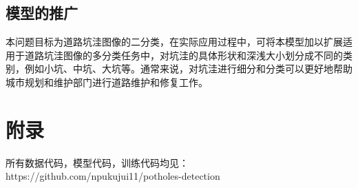 \documentclass[a4paper, 10pt]{article}
\begin{document}
	
	\subsection{模型的推广}
	
	本问题目标为道路坑洼图像的二分类，在实际应用过程中，可将本模型加以扩展适用于道路坑洼图像的多分类任务中，对坑洼的具体形状和深浅大小划分成不同的类别，例如小坑、中坑、大坑等。通常来说，对坑洼进行细分和分类可以更好地帮助城市规划和维护部门进行道路维护和修复工作。
	
	
	\section{附录}
	
	所有数据代码，模型代码，训练代码均见：https://github.com/npukujui11/potholes-detection
	
		
		
		
		
		
		
	
	
	
	
	
\end{document}

